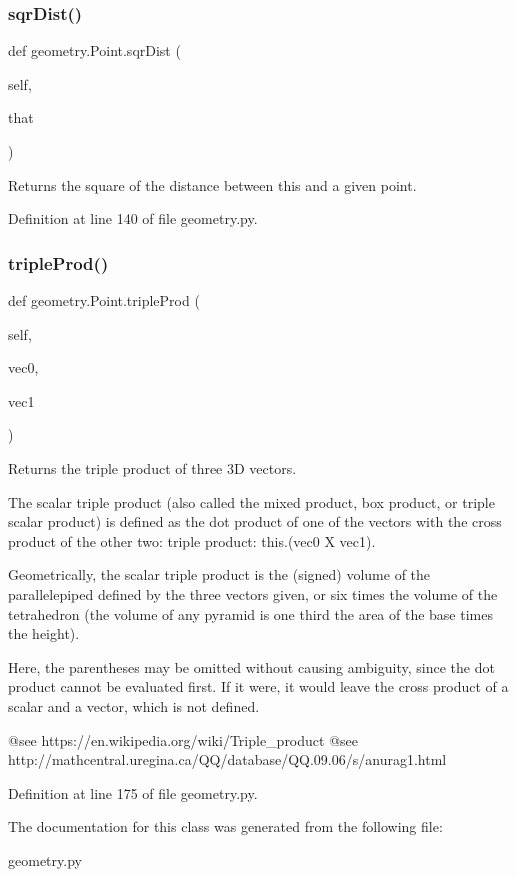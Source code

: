 \subsubsection{\texorpdfstring{sqr\+Dist()}{sqrDist()}}
{\footnotesize\ttfamily def geometry.\+Point.\+sqr\+Dist (\begin{DoxyParamCaption}\item[{}]{self,  }\item[{}]{that }\end{DoxyParamCaption})}

\begin{DoxyVerb}Returns the square of the distance between this and a given point.\end{DoxyVerb}
 

Definition at line 140 of file geometry.\+py.

\mbox{\label{classgeometry_1_1Point_acce6c690969f757d26e4a544955cb8f4}} 
\subsubsection{\texorpdfstring{triple\+Prod()}{tripleProd()}}
{\footnotesize\ttfamily def geometry.\+Point.\+triple\+Prod (\begin{DoxyParamCaption}\item[{}]{self,  }\item[{}]{vec0,  }\item[{}]{vec1 }\end{DoxyParamCaption})}

\begin{DoxyVerb}Returns the triple product of three 3D vectors.

   The scalar triple product (also called the mixed product, box product, or triple scalar product) 
   is defined as the dot product of one of the vectors with the cross product of the other two:
       triple product: this.(vec0 X vec1).

   Geometrically, the scalar triple product is the (signed) volume 
   of the parallelepiped defined by the three vectors given, or six
   times the volume of the tetrahedron (the volume of any pyramid is 
   one third the area of the base times the height). 

   Here, the parentheses may be omitted without causing ambiguity, 
   since the dot product cannot be evaluated first. 
   If it were, it would leave the cross product of a scalar and a vector, which is not defined.

   @see https://en.wikipedia.org/wiki/Triple_product
   @see http://mathcentral.uregina.ca/QQ/database/QQ.09.06/s/anurag1.html\end{DoxyVerb}
 

Definition at line 175 of file geometry.\+py.



The documentation for this class was generated from the following file\+:\begin{DoxyCompactItemize}
\item 
geometry.\+py\end{DoxyCompactItemize}
